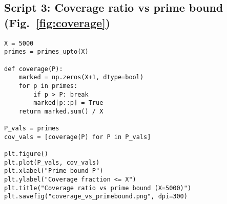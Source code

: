 \documentclass[12pt]{article}
\theoremstyle{definition}
\theoremstyle{remark}
\begin{document}
\subsection*{Script 3: Coverage ratio vs prime bound (Fig.~\ref{fig:coverage})}
\begin{verbatim}
X = 5000
primes = primes_upto(X)

def coverage(P):
    marked = np.zeros(X+1, dtype=bool)
    for p in primes:
        if p > P: break
        marked[p::p] = True
    return marked.sum() / X

P_vals = primes
cov_vals = [coverage(P) for P in P_vals]

plt.figure()
plt.plot(P_vals, cov_vals)
plt.xlabel("Prime bound P")
plt.ylabel("Coverage fraction <= X")
plt.title("Coverage ratio vs prime bound (X=5000)")
plt.savefig("coverage_vs_primebound.png", dpi=300)
\end{verbatim}
\end{document}

